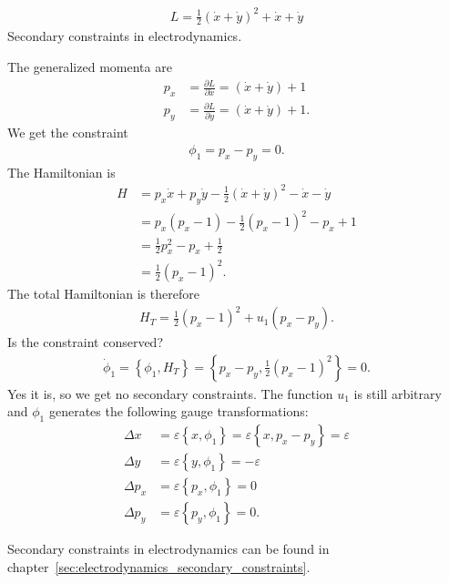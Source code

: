 \begin{exercise}
\begin{align*}
L = \frac{1}{2} (\dot{x} + \dot{y})^2 + \dot{x} + \dot{y}
\end{align*}
Secondary constraints in electrodynamics.
\end{exercise}
\begin{solution}
The generalized momenta are
\begin{align*}
p_x &= \frac{\partial L}{\partial \dot{x}} = (\dot{x} + \dot{y}) + 1 \\
p_y &= \frac{\partial L}{\partial \dot{y}} = (\dot{x} + \dot{y}) + 1.
\end{align*}
We get the constraint 
\begin{align*}
\phi_1 = p_x - p_y = 0.
\end{align*}
The Hamiltonian is
\begin{align*}
H &= p_x \dot{x} + p_y \dot{y} - \frac{1}{2} (\dot{x} + \dot{y})^2 - \dot{x} - \dot{y} \\
&= p_x (p_x - 1) - \frac{1}{2} (p_x - 1)^2 - p_x + 1 \\
&= \frac{1}{2} p_x^2 - p_x + \frac{1}{2} \\
&= \frac{1}{2} (p_x - 1)^2.
\end{align*}
The total Hamiltonian is therefore
\begin{align*}
H_T = \frac{1}{2} (p_x - 1)^2 + u_1 (p_x - p_y).
\end{align*}
Is the constraint conserved?
\begin{align*}
\dot{\phi}_1 = \left \{ \phi_1,H_T \right \} = \left \{ p_x - p_y,\frac{1}{2} (p_x - 1)^2 \right \} = 0.
\end{align*}
Yes it is, so we get no secondary constraints. The function $u_1$ is still arbitrary and $\phi_1$ generates the following gauge transformations:
\begin{align*}
\Delta x &= \varepsilon \left \{ x,\phi_1 \right \} = \varepsilon \left \{ x,p_x - p_y \right \} = \varepsilon \\
\Delta y &= \varepsilon \left \{ y,\phi_1 \right \} = - \varepsilon \\
\Delta p_x &= \varepsilon \left \{ p_x,\phi_1 \right \} = 0 \\
\Delta p_y &= \varepsilon \left \{ p_y,\phi_1 \right \} = 0.
\end{align*}

Secondary constraints in electrodynamics can be found in chapter~\vref{sec:electrodynamics_secondary_constraints}.
\end{solution}




